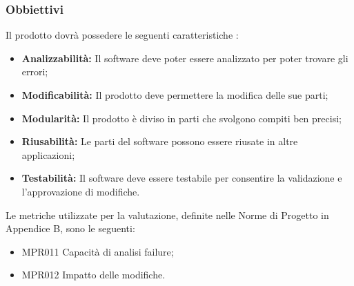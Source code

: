 \subsubsection{Obbiettivi } Il prodotto dovrà possedere le seguenti caratteristiche :
\begin{itemize}
	\item \textbf{Analizzabilità:} Il software deve poter essere analizzato per poter trovare gli errori;
	\item \textbf{Modificabilità:} Il prodotto deve permettere la modifica delle sue parti;
	\item \textbf{Modularità:} Il prodotto è diviso in parti che svolgono compiti ben precisi;
	\item \textbf{Riusabilità:} Le parti del software possono essere riusate in altre applicazioni;
	\item \textbf{Testabilità:} Il software deve essere testabile per consentire la validazione e l'approvazione di modifiche.
\end{itemize}	Le metriche utilizzate per la valutazione, definite nelle Norme di Progetto in Appendice B, sono le seguenti:
\begin{itemize}
	\item MPR011 Capacità di analisi failure;
	\item MPR012 Impatto delle modifiche.
\end{itemize}

